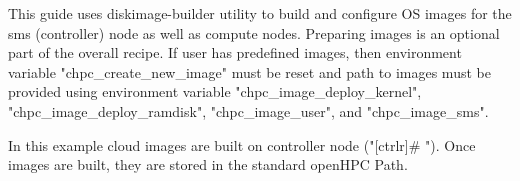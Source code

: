 

   This guide uses diskimage-builder utility to build and configure OS images 
for the sms (controller) node as well as compute nodes.  Preparing images is 
an optional part of the overall recipe. If user has predefined images, then 
environment variable "chpc\_create\_new\_image" must be reset and 
path to images must be provided using environment variable "chpc\_image\_deploy\_kernel", "chpc\_image\_deploy\_ramdisk",
"chpc\_image\_user", and "chpc\_image\_sms". 

In this example cloud images are built on controller node ("[ctrlr]\# "). Once images are built, they are stored in the standard openHPC Path.

\begin{lstlisting}[language=bash,keywords={}]
%[ctrlr](*\#*) CHPC_CLOUD_IMAGE_PATH=/opt/ohpc/admin/images/cloud/
\end{lstlisting}

